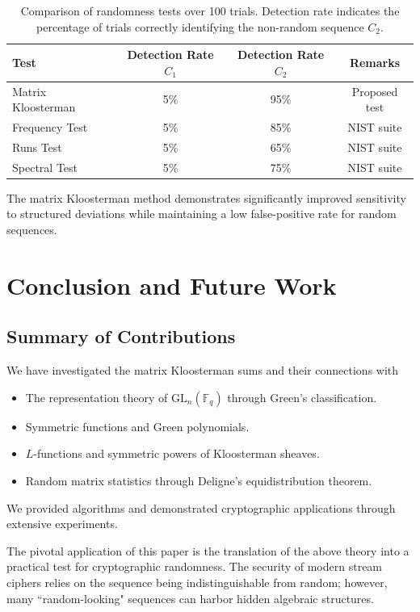 \documentclass[11pt]{article}
\newcommand{\Fq}{\mathbb{F}_q}
\newcommand{\GL}{\mathrm{GL}}
\begin{document}
\begin{table}[h!]
\centering
\begin{tabular}{lccc}
\toprule
Test & Detection Rate $C_1$ & Detection Rate $C_2$ & Remarks \\ \midrule
Matrix Kloosterman & 5\% & 95\% & Proposed test \\
Frequency Test & 5\% & 85\% & NIST suite \\
Runs Test & 5\% & 65\% & NIST suite \\
Spectral Test & 5\% & 75\% & NIST suite \\ 
\bottomrule
\end{tabular}
\caption{Comparison of randomness tests over 100 trials. Detection rate indicates the percentage of trials correctly identifying the non-random sequence $C_2$.}
\label{tab:test_comparison}
\end{table}

The matrix Kloosterman method demonstrates significantly improved sensitivity to structured deviations while maintaining a low false-positive rate for random sequences.

\section{Conclusion and Future Work}
\label{sec:conclusion}

\subsection{Summary of Contributions}

We have investigated the matrix Kloosterman sums and their connections with
\begin{itemize}
\item The representation theory of $\GL_n(\Fq)$ through Green's classification.
\item Symmetric functions and Green polynomials.
\item $L$-functions and symmetric powers of Kloosterman sheaves.
\item Random matrix statistics through Deligne's equidistribution theorem.
\end{itemize}

We provided algorithms and demonstrated cryptographic applications through extensive experiments.

The pivotal application of this paper is the translation of the above theory into a practical test for cryptographic randomness. The security of modern stream ciphers relies on the sequence being indistinguishable from random; however, many ``random-looking" sequences can harbor hidden algebraic structures.
\end{document}
